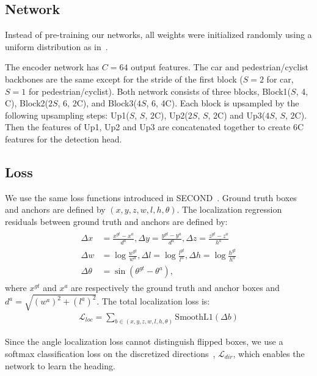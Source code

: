 \documentclass[10pt,twocolumn,letterpaper]{article}
\newcommand{\squeeze}{\vspace{-0.5mm}}
\begin{document}
\subsection{Network}
\squeeze
Instead of pre-training our networks, all weights were initialized randomly using a uniform distribution as in~\cite{heInit}. 

The encoder network has $C=64$ output features.
The car and pedestrian/cyclist backbones are the same except for the stride of the first block ($S=2$ for car, $S=1$ for pedestrian/cyclist).
Both network consists of three blocks, Block1($S$, 4, C), Block2($2S$, 6, 2C), and Block3($4S$, 6, 4C).
Each block is upsampled by the following upsampling steps: Up1($S$, $S$, 2C), Up2($2S$, $S$, 2C) and Up3($4S$, $S$, 2C).
Then the features of Up1, Up2 and Up3 are concatenated together to create 6C features for the detection head.



\subsection{Loss}
\squeeze
We use the same loss functions introduced in SECOND~\cite{second}.
Ground truth boxes and anchors are defined by $(x, y, z, w, l, h, \theta)$.
The localization regression residuals between ground truth and anchors are defined by:
\begin{eqnarray*}
\left.\begin{aligned}
\Delta x &= \frac{x^{gt} - x^a}{d^a}, \Delta y = \frac{y^{gt} - y^a}{d^a}, \Delta z = \frac{z^{gt} - z^a}{h^a} \\
\Delta w &= \log{\frac{w^{gt}}{w^a}}, \Delta l = \log{\frac{l^{gt}}{l^a}}, \Delta h = \log{\frac{h^{gt}}{h^a}} \\
\Delta \theta &= \sin{\left(\theta^{gt} - \theta^a\right)},
\end{aligned}\right.
\end{eqnarray*}
where $x^{gt}$ and $x^a$ are respectively the ground truth and anchor boxes and $d^a = \sqrt{(w^{a})^2+(l^{a})^2}$.
The total localization loss is:
\begin{eqnarray*}
\mathcal{L}_{loc} = \sum_{b \in (x, y, z, w, l, h, \theta)} \text{SmoothL1}\left(\Delta b\right)
\end{eqnarray*}

Since the angle localization loss cannot distinguish flipped boxes, we use a softmax classification loss on the discretized directions~\cite{second}, $\mathcal{L}_{dir}$, which enables the network to learn the heading.
\end{document}
